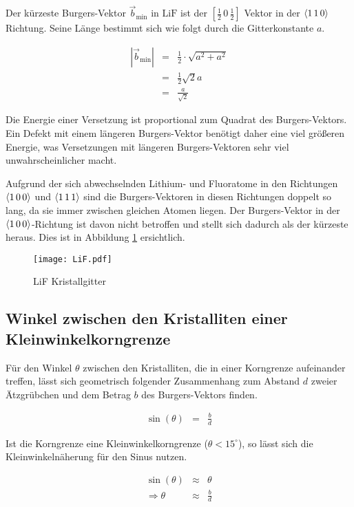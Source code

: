 \documentclass[12pt,a4paper]{scrartcl}
\numberwithin{equation}{section} %
\renewcommand{\[}{} %
\renewcommand{\]}{\noindent} %
\begin{document}
Der kürzeste Burgers-Vektor \(\vec{b}_\mathrm{min}\) in \(\mathrm{LiF}\)
ist der \([\frac{1}{2}\,0\,\frac{1}{2}]\) Vektor in der \(\expval{1\,1\,0}\) Richtung. Seine Länge bestimmt sich wie folgt durch die Gitterkonstante \(a\). \cite{Uni}
\[
\begin{eqnarray}
    \left|\vec{b}_\mathrm{min}\right|
        &=& \frac{1}{2} \cdot \sqrt{a^2 + a^2} \\
        &=& \frac{1}{2} \sqrt{2} a \\
        &=& \frac{a}{\sqrt{2}}
\end{eqnarray}
\]

\noindent
Die Energie einer Versetzung ist proportional zum Quadrat des
Burgers-Vektors. Ein Defekt mit einem längeren Burgers-Vektor benötigt
daher eine viel größeren Energie, was Versetzungen mit längeren
Burgers-Vektoren sehr viel unwahrscheinlicher macht.

Aufgrund der sich abwechselnden Lithium- und Fluoratome in den
Richtungen \(\expval{1\,0\,0}\) und \(\expval{1\,1\,1}\) sind die
Burgers-Vektoren in diesen Richtungen doppelt so lang, da sie immer
zwischen gleichen Atomen liegen. Der Burgers-Vektor in der
\(\expval{1\,0\,0}\)-Richtung ist davon nicht betroffen und stellt sich
dadurch als der kürzeste heraus. Dies ist in Abbildung \ref{abb:LiF Kristallgitter} ersichtlich.

\begin{figure}[ht]
\centering
\texttt{[image: LiF.pdf]}
\caption{LiF Kristallgitter \cite[S. 9]{Newey}}
\label{abb:LiF Kristallgitter}
\end{figure}

\hypertarget{winkel-zwischen-den-kristalliten-einer-kleinwinkelkorngrenze}{%
\subsection{Winkel zwischen den Kristalliten einer
Kleinwinkelkorngrenze}\label{winkel-zwischen-den-kristalliten-einer-kleinwinkelkorngrenze}}

Für den Winkel \(\theta\) zwischen den Kristalliten, die in einer
Korngrenze aufeinander treffen, lässt sich geometrisch folgender
Zusammenhang zum Abstand \(d\) zweier Ätzgrübchen und dem Betrag \(b\) des Burgers-Vektors finden.
\[
\begin{eqnarray}
    \sin(\theta) &=& \frac{b}{d}
\end{eqnarray}
\]

\noindent
Ist die Korngrenze eine Kleinwinkelkorngrenze (\(\theta < 15^\circ\)), so lässt sich die Kleinwinkelnäherung für den Sinus nutzen.
\[
\begin{eqnarray}
    \sin(\theta) &\approx& \theta \\
    \Rightarrow \theta &\approx& \frac{b}{d}
\end{eqnarray}
\]
\end{document}
